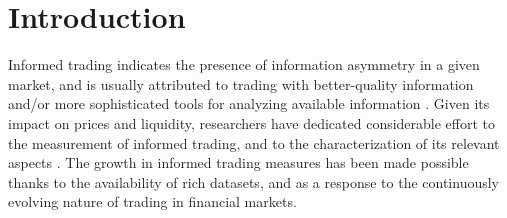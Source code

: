 \section{Introduction}

Informed trading indicates the presence of information asymmetry in a given market, and is usually attributed to trading with better-quality information and/or more sophisticated tools for analyzing available information \citep[see][]{Ahn2008Informed}. Given its impact on prices and liquidity, researchers have dedicated considerable effort to the measurement of informed trading, and to the characterization of its relevant aspects \citep{Berkman2014Informed,Chang2014dynamic, Bongaerts2014Cross-Sectional,Hsieh2014Informed,Yin2015Hidden, Guo2016Better}. The growth in informed trading measures has been made possible thanks to the availability of rich datasets, and as a response to the continuously evolving nature of trading in financial markets. 

